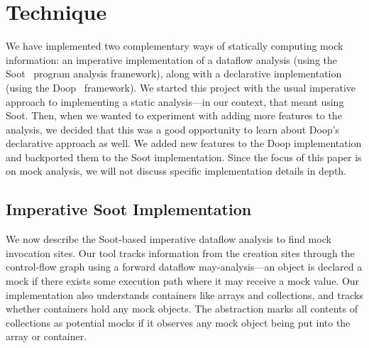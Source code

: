 \section{Technique}
\label{sec:technique}

We have implemented two complementary ways of statically computing mock information: an imperative implementation of a dataflow analysis (using the Soot~\cite{Vallee-Rai:1999:SJB:781995.782008} program analysis framework), along with a declarative implementation (using the Doop~\cite{bravenboer09:_stric_declar_specif_sophis_point_analy} framework). We started this project with the usual imperative approach to implementing a static analysis---in our context, that meant using Soot. Then, when we wanted to experiment with adding more features to the analysis, we decided that this was a good opportunity to learn about Doop's declarative approach as well. We added new features to the Doop implementation and backported them to the Soot implementation. Since the focus of this paper is on mock analysis, we will not discuss specific implementation details in depth.

\subsection{Imperative Soot Implementation}
\label{subsec:soot}
We now describe the Soot-based imperative dataflow analysis to find mock invocation sites. Our tool tracks information from the creation sites through the control-flow graph using a forward dataflow may-analysis---an object is declared a mock if there exists some execution path where it may receive a mock value. Our implementation also understands containers like arrays and collections, and tracks whether containers hold any mock objects. The abstraction marks all contents of collections as potential mocks if it observes any mock object being put into the array or container.


